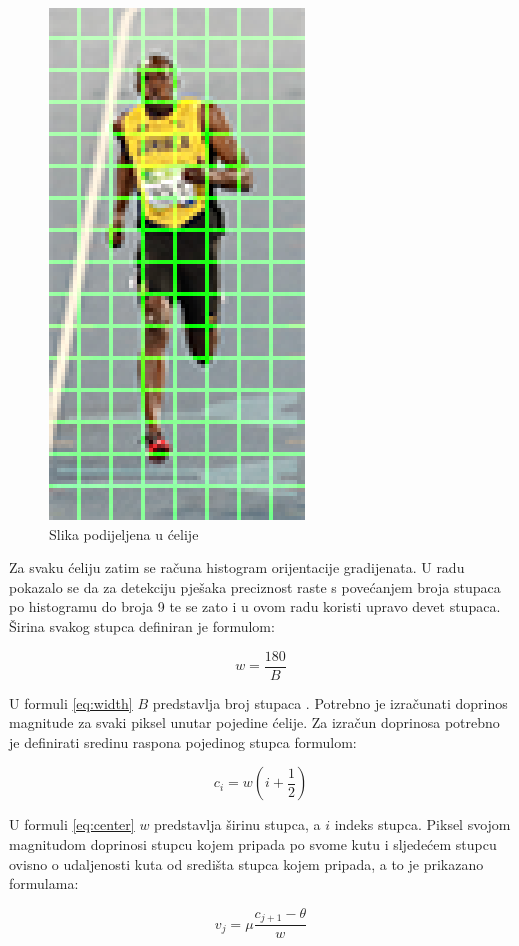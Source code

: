 \documentclass[times, utf8, zavrsni]{fer}
\begin{document}
\begin{figure}[htb]
	\centering
	\includegraphics[width=0.3\linewidth]{figures/hog-cells.png}
	\caption{Slika podijeljena u ćelije\protect\footnotemark}
	\label{fig:hogCells}
\end{figure}



Za svaku ćeliju zatim se računa histogram orijentacije gradijenata. U radu \citep{dalal2005histograms} pokazalo se da za detekciju pješaka preciznost raste s povećanjem broja stupaca po histogramu do broja 9 te se zato i u ovom radu koristi upravo devet stupaca. Širina svakog stupca definiran je formulom:

\begin{equation}
	w = \frac{180}{B}
	\label{eq:width}
\end{equation}

U formuli \ref{eq:width} \(B\) predstavlja broj stupaca \citep{tomasi2012histograms}. Potrebno je izračunati doprinos magnitude za svaki piksel unutar pojedine ćelije. Za izračun doprinosa potrebno je definirati sredinu raspona pojedinog stupca formulom:

\begin{equation}
	c_i = w(i + \frac{1}{2})
	\label{eq:center}
\end{equation}

 U formuli \ref{eq:center} \(w\) predstavlja širinu stupca, a \(i\) indeks stupca. Piksel svojom magnitudom doprinosi stupcu kojem pripada po svome kutu i sljedećem stupcu ovisno o udaljenosti kuta od središta stupca kojem pripada, a to je prikazano formulama: 
 
 \begin{equation}
	v_{j} = \mu \frac{c_{j + 1} - \theta}{w}
 	\label{eq:vote}
 \end{equation}
 
\end{document}
